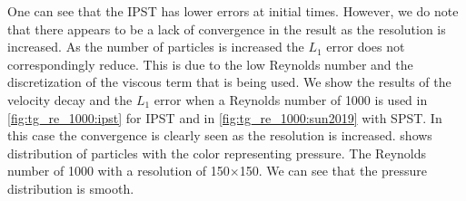 \documentclass[preprint,12pt]{elsarticle}
\begin{document}
One can see that the IPST has lower errors at initial times. However,
we do note that there appears to be a lack of convergence in the result as the
resolution is increased. As the number of particles is increased the $L_1$
error does not correspondingly reduce. This is due to the low Reynolds number
and the discretization of the viscous term that is being used. We show the
results of the velocity decay and the $L_1$ error when a Reynolds number of
1000 is used in \cref{fig:tg_re_1000:ipst} for IPST and in
\cref{fig:tg_re_1000:sun2019} with SPST. In this case the convergence
is clearly seen as the resolution is increased. 
shows distribution of particles with the color representing pressure. The
Reynolds number of 1000 with a resolution of 150$\times$150. We can see
that the pressure distribution is smooth.
\end{document}
